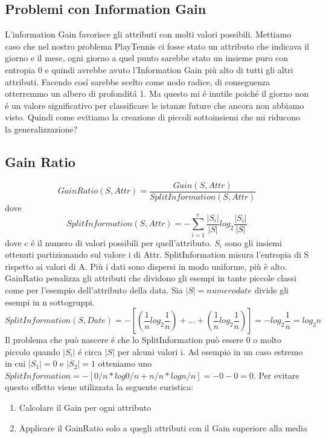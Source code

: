\documentclass{article}
\begin{document}
\subsection{Problemi con Information Gain}
L'information Gain favorisce gli attributi con molti valori possibili. Mettiamo caso che nel nostro problema PlayTennis ci fosse stato un attributo che indicava il giorno e il mese, ogni giorno a quel punto sarebbe stato un insieme puro con entropia 0 e quindi avrebbe avuto l'Information Gain più alto di tutti gli altri attributi. Facendo cosí sarebbe scelto come nodo radice, di conseguenza otterremmo un albero di profonditá 1. Ma questo mi é inutile poiché il giorno non é un valore significativo per classificare le istanze future che ancora non abbiamo visto. Quindi come evitiamo la creazione di piccoli sottoinsiemi che mi riducono la generalizzazione?

\subsection{Gain Ratio}
\begin{equation}
    GainRatio(S,Attr)=\frac{Gain(S,Attr)}{SplitInformation(S,Attr)}
\end{equation}
dove
\begin{equation}
    SplitInformation(S,Attr)=-\sum_{i=1}^c \frac{|S_i|}{|S|}log_2\frac{|S_i|}{|S|}
\end{equation}
dove c é il numero di valori possibili per quell'attributo. $S_i$ sono gli insiemi ottenuti partizionando sul valore i di Attr. \newline 
SplitInformation misura l'entropia di S rispetto ai valori di A. Più i dati sono dispersi in modo uniforme, più è alto. GainRatio penalizza gli attributi che dividono gli esempi in tante piccole classi come per l'esempio dell'attributo della data. Sia $| S | = numerodate$ divide gli esempi in n sottogruppi.
\begin{equation}
    SplitInformation(S, Date)= -[(\frac{1}{n} log_2 \frac{1}{n})+...+ (\frac{1}{n}log_2 \frac{1}{n})]= - log_2\frac{1}{n} =log_2n
\end{equation}
Il problema che può nascere é che lo SplitInformation può essere 0 o molto piccolo quando $|S_i|$ é circa $|S|$ per alcuni valori i. Ad esempio in un caso estremo in cui $|S_1|=0$ e $|S_2|=1$ otteniamo uno $SplitInformation = -[0/n * log 0/n + n/n * log n/n] = - 0 - 0 = 0$. Per evitare questo effetto viene utilizzata la seguente euristica:
\begin{enumerate}
    \item Calcolare il Gain per ogni attributo
    \item Applicare il GainRatio solo a quegli attributi con il Gain superiore alla media
\end{enumerate}
\end{document}
